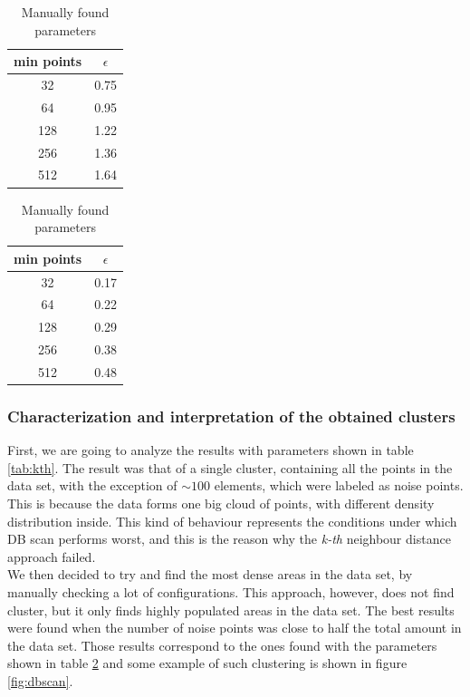 \documentclass{article}
\begin{document}
	\begin{table}
		\parbox{.45\linewidth}{
			\centering
			\begin{tabular}{c|c}
				\hline
				min points & $\epsilon$\\
				\hline
				\rowcolor{Gray}
				32 & 0.75 \\
				64 & 0.95 \\
				\rowcolor{Gray}
				128 & 1.22 \\
				256 & 1.36 \\
				\rowcolor{Gray}
				512 & 1.64 \\
			\end{tabular}
			\caption{K-th nearest neighbours parameters}
			\label{tab:kth}
		}
		\hfill
		\parbox{.45\linewidth}{
			\centering
			\begin{tabular}{c|c}
				\hline
				min points & $\epsilon$\\
				\hline
				\rowcolor{Gray}
				32 & 0.17 \\
				64 & 0.22 \\
				\rowcolor{Gray}
				128 & 0.29 \\
				256 & 0.38 \\
				\rowcolor{Gray}
				512 & 0.48 \\
			\end{tabular}
			\caption{Manually found parameters}
			\label{tab:dbscan}
		}
	\end{table}
	
	\subsubsection{Characterization and interpretation of the obtained clusters}
	\label{sec:dbscaneval}
	First, we are going to analyze the results with parameters shown in table \ref{tab:kth}. The result was that of a single cluster, containing all the points in the data set, with the exception of $\sim 100$ elements, which were labeled as noise points. This is because the data forms one big cloud of points, with different density distribution inside. This kind of behaviour represents the conditions under which DB scan performs worst, and this is the reason why the \emph{k-th} neighbour distance approach failed. \\
	We then decided to try and find the most dense areas in the data set, by manually checking a lot of configurations. This approach, however, does not find cluster, but it only finds highly populated areas in the data set. 
	The best results were found when the number of noise points was close to half the total amount in the data set. Those results correspond to the ones found with the parameters shown in table \ref{tab:dbscan} and some example of such clustering is shown in figure \ref{fig:dbscan}.
	
\end{document}

